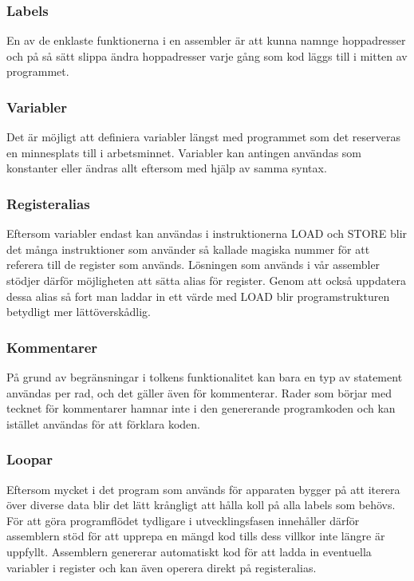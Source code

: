 \documentclass[a4paper]{article}
\begin{document}
    \subsubsection{Labels}
    En av de enklaste funktionerna i en assembler är att kunna namnge hoppadresser
    och på så sätt slippa ändra hoppadresser varje gång som kod läggs till i mitten
    av programmet. 

    \subsubsection{Variabler}
    Det är möjligt att definiera variabler längst med programmet som det
    reserveras en minnesplats till i arbetsminnet. Variabler kan antingen
    användas som konstanter eller ändras allt eftersom med hjälp av samma
    syntax. 
    \subsubsection{Registeralias}
    Eftersom variabler endast kan användas i instruktionerna LOAD och STORE blir
    det många instruktioner som använder så kallade magiska nummer för att
    referera till de register som används. Lösningen som används i vår assembler
    stödjer därför möjligheten att sätta alias för register. Genom att också
    uppdatera dessa alias så fort man laddar in ett värde med LOAD blir
    programstrukturen betydligt mer lättöverskådlig. 
    \subsubsection{Kommentarer}
    På grund av begränsningar i tolkens funktionalitet kan bara en typ av
    statement användas per rad, och det gäller även för kommenterar. Rader som
    börjar med tecknet för kommentarer hamnar inte i den genererande
    programkoden och kan istället användas för att förklara koden. 
    \subsubsection{Loopar}
    Eftersom mycket i det program som används för apparaten bygger på att iterera över diverse data
    blir det lätt krångligt att hålla koll på alla labels som behövs. För att göra programflödet
    tydligare i utvecklingsfasen innehåller därför assemblern stöd för att upprepa en mängd kod
    tills dess villkor inte längre är uppfyllt. Assemblern genererar automatiskt kod för att ladda
    in eventuella variabler i register och kan även operera direkt på registeralias.
\end{document}
